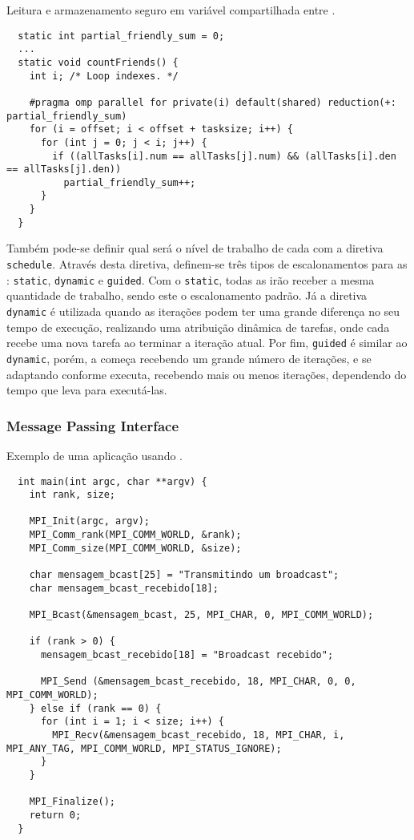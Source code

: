 \begin{listing}[tb]
\caption{Leitura e armazenamento seguro em variável compartilhada entre \threads.}
\label{lst:reductionloop}
\begin{verbatim}
  static int partial_friendly_sum = 0;
  ...
  static void countFriends() {
    int i; /* Loop indexes. */

    #pragma omp parallel for private(i) default(shared) reduction(+: partial_friendly_sum)
    for (i = offset; i < offset + tasksize; i++) {
      for (int j = 0; j < i; j++) {
        if ((allTasks[i].num == allTasks[j].num) && (allTasks[i].den == allTasks[j].den))
          partial_friendly_sum++;
      }
    }
  }
\end{verbatim}
\end{listing}

Também pode-se definir qual será o nível de trabalho de cada \thread com a diretiva \texttt{schedule}. Através desta diretiva, definem-se três tipos de escalonamentos para as \threads: \texttt{static}, \texttt{dynamic} e \texttt{guided}. Com o \texttt{static}, todas as \threads irão receber a mesma quantidade de trabalho, sendo este o escalonamento padrão. Já a diretiva \texttt{dynamic} é utilizada quando as iterações podem ter uma grande diferença no seu tempo de execução, realizando uma atribuição dinâmica de tarefas, onde cada \thread recebe uma nova tarefa ao terminar a iteração atual. Por fim, \texttt{guided} é similar ao \texttt{dynamic}, porém, a \thread começa recebendo um grande número de iterações, e se adaptando conforme executa, recebendo mais ou menos iterações, dependendo do tempo que leva para executá-las.

\subsubsection{Message Passing Interface}
\label{sec:mpi}

\begin{listing}[tb]
\caption{Exemplo de uma aplicação usando \MPI.}
\label{lst:programmpi}
\begin{verbatim}
  int main(int argc, char **argv) {
    int rank, size;

    MPI_Init(argc, argv);
    MPI_Comm_rank(MPI_COMM_WORLD, &rank);
    MPI_Comm_size(MPI_COMM_WORLD, &size);

    char mensagem_bcast[25] = "Transmitindo um broadcast";
    char mensagem_bcast_recebido[18];

    MPI_Bcast(&mensagem_bcast, 25, MPI_CHAR, 0, MPI_COMM_WORLD);

    if (rank > 0) {
      mensagem_bcast_recebido[18] = "Broadcast recebido";

      MPI_Send (&mensagem_bcast_recebido, 18, MPI_CHAR, 0, 0, MPI_COMM_WORLD);
    } else if (rank == 0) {
      for (int i = 1; i < size; i++) {
        MPI_Recv(&mensagem_bcast_recebido, 18, MPI_CHAR, i, MPI_ANY_TAG, MPI_COMM_WORLD, MPI_STATUS_IGNORE);
      }
    }

    MPI_Finalize();
    return 0;
  }
\end{verbatim}
\end{listing}


